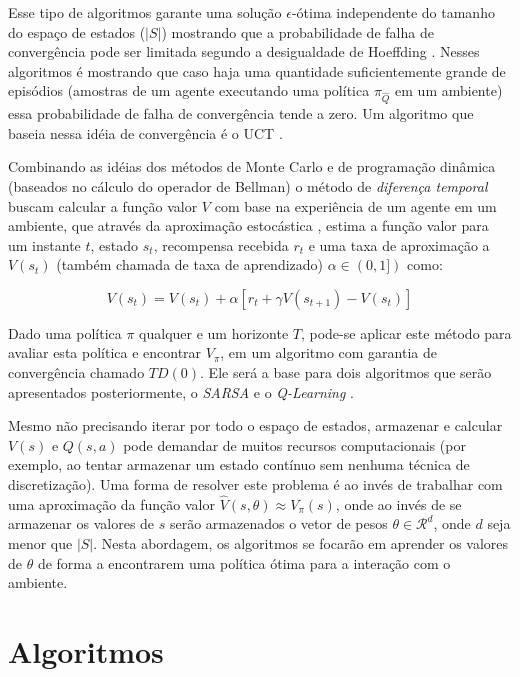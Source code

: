 \documentclass[letterpaper]{article}
\begin{document}
Esse tipo de algoritmos garante uma solução $\epsilon$-ótima independente do tamanho do espaço de estados ($|S|$) mostrando que a probabilidade de falha de convergência pode ser limitada segundo a desigualdade de Hoeffding \cite{Hoeffding-1994}. Nesses algoritmos é mostrando que caso haja uma quantidade suficientemente grande de episódios (amostras de um agente executando uma política $\pi_{\hat{Q}}$ em um ambiente) essa probabilidade de falha de convergência tende a zero. Um algoritmo que baseia nessa idéia de convergência é o UCT \cite{KocsisSzepesv-2006}.

Combinando as idéias dos métodos de Monte Carlo e de programação dinâmica (baseados no cálculo do operador de Bellman) o método de \textit{diferença temporal} buscam calcular a função valor $V$ com base na experiência de um agente em um ambiente, que através da aproximação estocástica \cite{RobbinsMonro-1951}, estima a função valor para um instante $t$, estado $s_t$, recompensa recebida $r_t$ e  uma taxa de aproximação a $V(s_t)$ (também chamada de taxa de aprendizado) $\alpha \in (0, 1])$ como:

\begin{equation} \label{eq:temporal_difference}
  V(s_t) = V(s_t) + \alpha [ r_t + \gamma V(s_{t+1}) - V(s_t) ]
\end{equation}

Dado uma política $\pi$ qualquer e um horizonte $T$, pode-se aplicar este método para avaliar esta política e encontrar $V_{\pi}$, em um algoritmo com garantia de convergência chamado $TD(0)$. Ele será a base para dois algoritmos que serão apresentados posteriormente, o \textit{SARSA} e o \textit{Q-Learning} \cite{Watkins-Dayan-1992}.

Mesmo não precisando iterar por todo o espaço de estados, armazenar e calcular $V(s)$ e $Q(s,a)$ pode demandar de muitos recursos computacionais (por exemplo, ao tentar armazenar um estado contínuo sem nenhuma técnica de discretização). Uma forma de resolver este problema é ao invés de trabalhar com uma aproximação da função valor $ \hat{V}(s, \theta) \approx V_{\pi}(s)$, onde ao invés de se armazenar os valores de $s$ serão armazenados o vetor de pesos $\theta \in \mathcal{R}^d$, onde $d$ seja menor que $|S|$. Nesta abordagem, os algoritmos se focarão em aprender os valores de $\theta$ de forma a encontrarem uma política ótima para a interação com o ambiente.

\section{Algoritmos}
\end{document}
